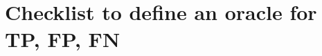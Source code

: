 \documentclass[conference]{IEEEtran}
\begin{document}














  






\section{Checklist to define an oracle for TP, FP, FN}
\label{sec:criteria}
\end{document}
